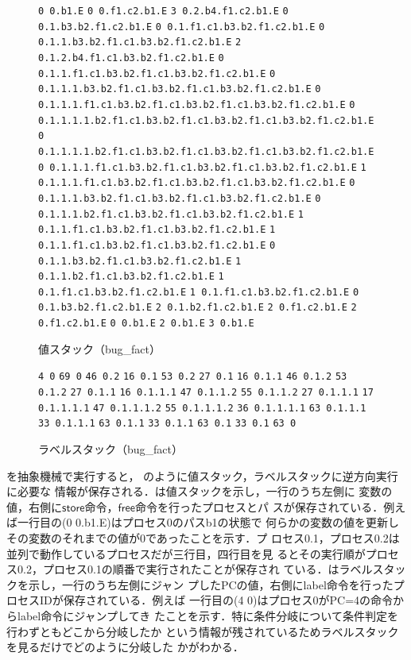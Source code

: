 \documentclass[submit,PRO]{ipsj}
\newcommand{\bcode}[1]{$\mathsf{#1}$}
\def\|{\verb|}
\begin{document}
\begin{figure}[tb]
\vbox{
\hbox{\|0 0.b1.E|}
\hbox{\|0 0.f1.c2.b1.E|}
\hbox{\|3 0.2.b4.f1.c2.b1.E|}
\hbox{\|0 0.1.b3.b2.f1.c2.b1.E|}
\hbox{\|0 0.1.f1.c1.b3.b2.f1.c2.b1.E|}
\hbox{\|0 0.1.1.b3.b2.f1.c1.b3.b2.f1.c2.b1.E|}
\hbox{\|2 0.1.2.b4.f1.c1.b3.b2.f1.c2.b1.E|}
\hbox{\|0 0.1.1.f1.c1.b3.b2.f1.c1.b3.b2.f1.c2.b1.E|}
\hbox{\|0 0.1.1.1.b3.b2.f1.c1.b3.b2.f1.c1.b3.b2.f1.c2.b1.E|}
\hbox{\|0 0.1.1.1.f1.c1.b3.b2.f1.c1.b3.b2.f1.c1.b3.b2.f1.c2.b1.E|}
\hbox{\|0 0.1.1.1.1.b2.f1.c1.b3.b2.f1.c1.b3.b2.f1.c1.b3.b2.f1.c2.b1.E|}
\hbox{\|0 0.1.1.1.1.b2.f1.c1.b3.b2.f1.c1.b3.b2.f1.c1.b3.b2.f1.c2.b1.E|}
\hbox{\|0 0.1.1.1.f1.c1.b3.b2.f1.c1.b3.b2.f1.c1.b3.b2.f1.c2.b1.E|}
\hbox{\|1 0.1.1.1.f1.c1.b3.b2.f1.c1.b3.b2.f1.c1.b3.b2.f1.c2.b1.E|}
\hbox{\|0 0.1.1.1.b3.b2.f1.c1.b3.b2.f1.c1.b3.b2.f1.c2.b1.E|}
\hbox{\|0 0.1.1.1.b2.f1.c1.b3.b2.f1.c1.b3.b2.f1.c2.b1.E|}
\hbox{\|1 0.1.1.f1.c1.b3.b2.f1.c1.b3.b2.f1.c2.b1.E|}
\hbox{\|1 0.1.1.f1.c1.b3.b2.f1.c1.b3.b2.f1.c2.b1.E|}
\hbox{\|0 0.1.1.b3.b2.f1.c1.b3.b2.f1.c2.b1.E|}
\hbox{\|1 0.1.1.b2.f1.c1.b3.b2.f1.c2.b1.E|}
\hbox{\|1 0.1.f1.c1.b3.b2.f1.c2.b1.E|}
\hbox{\|1 0.1.f1.c1.b3.b2.f1.c2.b1.E|}
\hbox{\|0 0.1.b3.b2.f1.c2.b1.E|}
\hbox{\|2 0.1.b2.f1.c2.b1.E|}
\hbox{\|2 0.f1.c2.b1.E|}
\hbox{\|2 0.f1.c2.b1.E|}
\hbox{\|0 0.b1.E|}
\hbox{\|2 0.b1.E|}
\hbox{\|3 0.b1.E|}
}
\centerline{}
\caption{値スタック（bug\_fact）}
\label{fig:value}
\end{figure}

\begin{figure}[tb]
\vbox{
\hbox{\|4 0|}
\hbox{\|69 0|}
\hbox{\|46 0.2|}
\hbox{\|16 0.1|}
\hbox{\|53 0.2|}
\hbox{\|27 0.1|}
\hbox{\|16 0.1.1|}
\hbox{\|46 0.1.2|}
\hbox{\|53 0.1.2|}
\hbox{\|27 0.1.1|}
\hbox{\|16 0.1.1.1|}
\hbox{\|47 0.1.1.2|}
\hbox{\|55 0.1.1.2|}
\hbox{\|27 0.1.1.1|}
\hbox{\|17 0.1.1.1.1|}
\hbox{\|47 0.1.1.1.2|}
\hbox{\|55 0.1.1.1.2|}
\hbox{\|36 0.1.1.1.1|}
\hbox{\|63 0.1.1.1|}
\hbox{\|33 0.1.1.1|}
\hbox{\|63 0.1.1|}
\hbox{\|33 0.1.1|}
\hbox{\|63 0.1|}
\hbox{\|33 0.1|}
\hbox{\|63 0|}
}
\centerline{}
\caption{ラベルスタック（bug\_fact）}
\label{fig:label}
\end{figure}


を抽象機械で実行すると，
のように値スタック，ラベルスタックに逆方向実行に必要な
情報が保存される．は値スタックを示し，一行のうち左側に
変数の値，右側に\bcode{store}命令，\bcode{free}命令を行ったプロセスとパ
スが保存されている．例えば一行目の(0 0.b1.E)はプロセス0のパスb1の状態で
何らかの変数の値を更新しその変数のそれまでの値が0であったことを示す．プ
ロセス0.1，プロセス0.2は並列で動作しているプロセスだが三行目，四行目を見
るとその実行順がプロセス0.2，プロセス0.1の順番で実行されたことが保存され
ている．はラベルスタックを示し，一行のうち左側にジャン
プしたPCの値，右側にlabel命令を行ったプロセスIDが保存されている．例えば
一行目の(4 0)はプロセス0がPC=4の命令からlabel命令にジャンプしてき
たことを示す．特に条件分岐について条件判定を行わずともどこから分岐したか
という情報が残されているためラベルスタックを見るだけでどのように分岐した
かがわかる．
\end{document}

